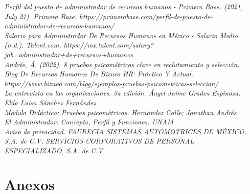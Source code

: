 \documentclass[letterpaper,12pt]{article}
\begin{document}
\begin{sloppypar}
\textit{Perfil del puesto de administrador de recursos humanos - Primera Base. (2021, July 21). Primera Base. https://primerabase.com/perfil-de-puesto-de-administrador-de-recursos-humanos/}
\vspace{0.3cm}\\ 
\textit{Salario para Administrador De Recursos Humanos en México - Salario Medio. (n.d.). Talent.com. https://mx.talent.com/salary?job=administrador+de+recursos+humanos}
\vspace{0.3cm}\\ 
\textit{Andrés, Á. (2022). 8 pruebas psicométricas clave en reclutamiento y selección. Blog De Recursos Humanos De Bizneo HR: Práctico Y Actual. https://www.bizneo.com/blog/ejemplos-pruebas-psicometricas-seleccion/}
\vspace{0.3cm}\\ 
\textit{La entrevista en las organizaciones. 3a edición. Ángel Jaime Grados Espinoza. Elda Luisa Sánchez Fernández}
\vspace{0.3cm}\\ 
\textit{Módulo Didáctico: Pruebas psicométricas. Hernández Calle; Jonathan Andrés}
\vspace{0.3cm}\\ 
\textit{El Administrador: Concepto, Perfil y Funciones. UNAM}
\vspace{0.3cm}\\ 
\textit{Aviso de privacidad. FAURECIA SISTEMAS AUTOMOTRICES DE MÉXICO, S.A. de C.V.
SERVICIOS CORPORATIVOS DE PERSONAL ESPECIALIZADO, S.A. de C.V.}

\section{\textcolor[rgb]{0.4,0.4,0.9}{Anexos}}


\end{sloppypar}
\end{document}
